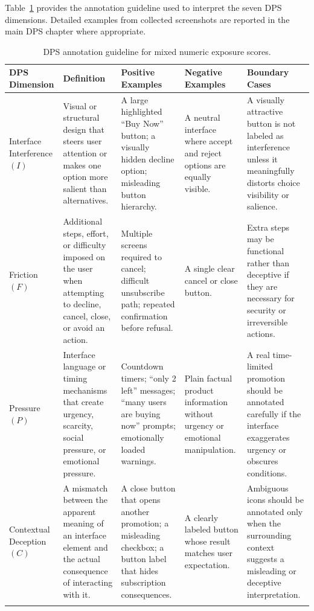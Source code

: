 Table~\ref{tab:dps-guideline} provides the annotation guideline used to interpret the seven DPS dimensions. Detailed examples from collected screenshots are reported in the main DPS chapter where appropriate.

\begin{table}[htbp]
    \centering
    \caption{DPS annotation guideline for mixed numeric exposure scores.}
    \label{tab:dps-guideline}
    \footnotesize
    \setlength{\tabcolsep}{3pt}
    \renewcommand{\arraystretch}{1.06}
    \begin{tabularx}{\textwidth}{@{}p{1.75cm}XXXX@{}}
        \toprule
        \textbf{DPS Dimension} &
        \textbf{Definition} &
        \textbf{Positive Examples} &
        \textbf{Negative Examples} &
        \textbf{Boundary Cases} \\
        \midrule
        Interface Interference \((I)\) &
        Visual or structural design that steers user attention or makes one option more salient than alternatives. &
        A large highlighted ``Buy Now'' button; a visually hidden decline option; misleading button hierarchy. &
        A neutral interface where accept and reject options are equally visible. &
        A visually attractive button is not labeled as interference unless it meaningfully distorts choice visibility or salience. \\
        \addlinespace

        Friction \((F)\) &
        Additional steps, effort, or difficulty imposed on the user when attempting to decline, cancel, close, or avoid an action. &
        Multiple screens required to cancel; difficult unsubscribe path; repeated confirmation before refusal. &
        A single clear cancel or close button. &
        Extra steps may be functional rather than deceptive if they are necessary for security or irreversible actions. \\
        \addlinespace

        Pressure \((P)\) &
        Interface language or timing mechanisms that create urgency, scarcity, social pressure, or emotional pressure. &
        Countdown timers; ``only 2 left'' messages; ``many users are buying now'' prompts; emotionally loaded warnings. &
        Plain factual product information without urgency or emotional manipulation. &
        A real time-limited promotion should be annotated carefully if the interface exaggerates urgency or obscures conditions. \\
        \addlinespace

        Contextual Deception \((C)\) &
        A mismatch between the apparent meaning of an interface element and the actual consequence of interacting with it. &
        A close button that opens another promotion; a misleading checkbox; a button label that hides subscription consequences. &
        A clearly labeled button whose result matches user expectation. &
        Ambiguous icons should be annotated only when the surrounding context suggests a misleading or deceptive interpretation. \\
        \addlinespace


\end{tabularx}
\end{table}
